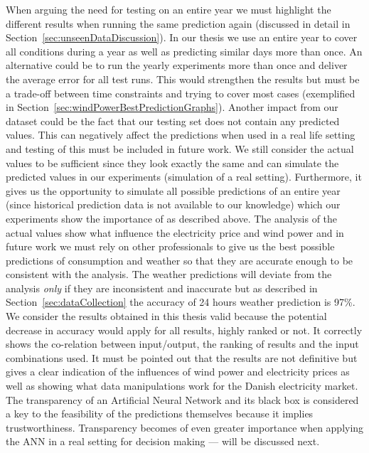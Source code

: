 When arguing the need for testing on an entire year we must highlight the different results when running the same prediction again (discussed in detail in Section~\ref{sec:unseenDataDiscussion}). In our thesis we use an entire year to cover all conditions during a year as well as predicting similar days more than once. An alternative could be to run the yearly experiments more than once and deliver the average error for all test runs. This would strengthen the results but must be a trade-off between time constraints and trying to cover most cases (exemplified in Section~\ref{sec:windPowerBestPredictionGraphs}). Another impact from our dataset could be the fact that our testing set does not contain any predicted values. This can negatively affect the predictions when used in a real life setting and testing of this must be included in future work. We still consider the actual values to be sufficient since they look exactly the same and can simulate the predicted values in our experiments (simulation of a real setting). Furthermore, it gives us the opportunity to simulate all possible predictions of an entire year (since historical prediction data is not available to our knowledge) which our experiments show the importance of as described above. The analysis of the actual values show what influence the electricity price and wind power and in future work we must rely on other professionals to give us the best possible predictions of consumption and weather so that they are accurate enough to be consistent with the analysis. The weather predictions will deviate from the analysis \emph{only} if they are inconsistent and inaccurate but as described in Section~\ref{sec:dataCollection} the accuracy of 24 hours weather prediction is 97\%. We consider the results obtained in this thesis valid because the potential decrease in accuracy would apply for all results, highly ranked or not. It correctly shows the co-relation between input/output, the ranking of results and the input combinations used. It must be pointed out that the results are not definitive but gives a clear indication of the influences of wind power and electricity prices as well as showing what data manipulations work for the Danish electricity market. The transparency of an Artificial Neural Network and its black box is considered a key to the feasibility of the predictions themselves because it implies trustworthiness. Transparency becomes of even greater importance when applying the ANN in a real setting for decision making --- will be discussed next.


